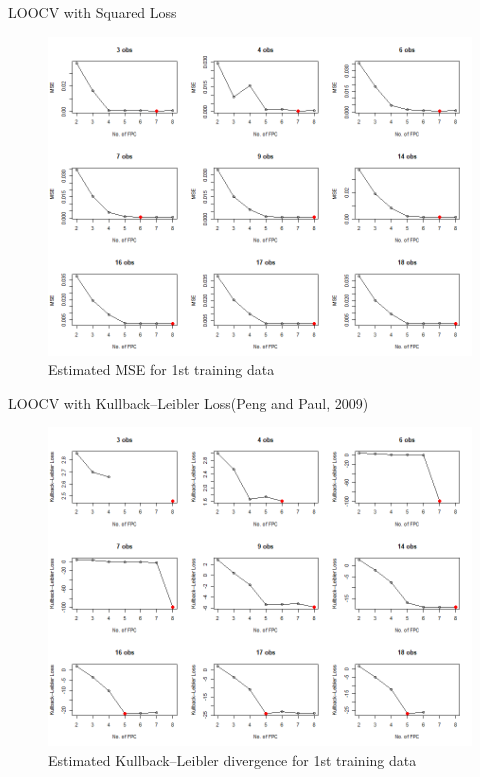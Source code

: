 \documentclass{beamer}
\begin{document}
\begin{frame}{LOOCV with Squared Loss}
	\begin{figure}[h] %
		\begin{center}
			\includegraphics[width=0.8\linewidth]{img/1.png}
		\end{center}
		\label{fig:long}
		\label{fig:onecol}
		\caption{Estimated MSE for 1st training data}
	\end{figure}
\end{frame}

\begin{frame}{LOOCV with Kullback–Leibler Loss(Peng and Paul, 2009)}
	\begin{figure}[h] %
		\begin{center}
			\includegraphics[width=0.8\linewidth]{img/2.png}
		\end{center}
		\label{fig:long}
		\label{fig:onecol}
		\caption{Estimated Kullback–Leibler divergence for 1st training data}
	\end{figure}
\end{frame}
\end{document}
